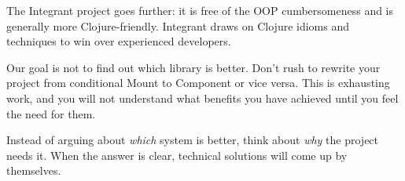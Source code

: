 The Integrant project goes further: it is free of the OOP cumbersomeness and is generally more Clojure-friendly. Integrant draws on Clojure idioms and techniques to win over experienced developers.

Our goal is not to find out which library is better. Don't rush to rewrite your project from conditional Mount to Component or vice versa. This is exhausting work, and you will not understand what benefits you have achieved until you feel the need for them.

Instead of arguing about \emph{which} system is better, think about \emph{why} the project needs it. When the answer is clear, technical solutions will come up by themselves.
